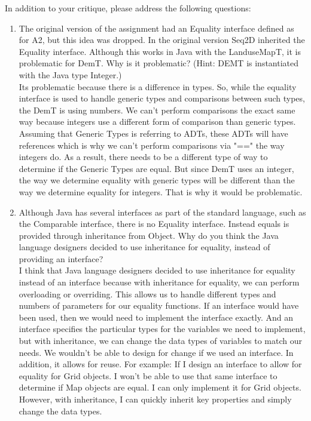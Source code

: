 \documentclass[12pt]{article}
\begin{document}
In addition to your critique, please address the following questions:
\begin{enumerate}
\item The original version of the assignment had an Equality interface defined
  as for A2, but this idea was dropped.  In the original version Seq2D inherited
  the Equality interface.  Although this works in Java with the LanduseMapT, it is
  problematic for DemT.  Why is it problematic?  (Hint: DEMT is instantiated
  with the Java type Integer.)\\
  Its problematic because there is a difference in types. So, while the equality interface is used to handle generic types and comparisons between
  such types, the DemT is using numbers. We can't perform comparisons the exact same way because integers use a different form of comparison than generic types.
  Assuming that Generic Types is referring to ADTs, these ADTs will have references which is why we can't perform comparisons via "==" the way integers do. As a result, there needs to be a different
  type of way to determine if the Generic Types are equal. But since DemT uses an integer, the way we determine equality with generic types will be different than the
  way we determine equality for integers. That is why it would be problematic.


\item Although Java has several interfaces as part of the standard language,
  such as the Comparable interface, there is no Equality interface.  Instead
  equals is provided through inheritance from Object.  Why do you think the
  Java language designers decided to use inheritance for equality, instead of
  providing an interface?\\

  I think that Java language designers decided to use inheritance for equality instead of an interface
  because with inheritance for equality, we can perform overloading or overriding. This allows us to handle different
  types and numbers of parameters for our equality functions. If an interface would have been used, then 
  we would need to implement the interface exactly. And an interface specifies the particular types for the variables 
  we need to implement, but with inheritance, we can change the data types of variables to match our needs. We wouldn't be able to design for change if we used an interface.
  In addition, it allows for reuse. For example: If I design an interface to allow for equality for Grid objects. I won't be able
  to use that same interface to determine if Map objects are equal. I can only implement it for Grid objects. However, with inheritance,
  I can quickly inherit key properties and simply change the data types. 


\end{enumerate}
\end{document}

